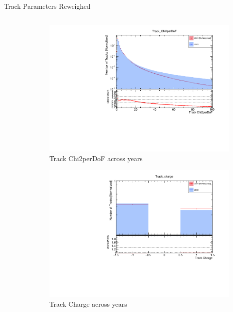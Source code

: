 \begin{frame}{Track Parameters Reweighed}
\begin{columns}
\begin{column}{0.5\linewidth}
\begin{figure}
            \end{figure}
        \end{column}
        \begin{column}{0.5\linewidth}
            \vspace{-0.45cm}
            \begin{figure}
                \includegraphics[width=\linewidth]{./ReweighedPlots/Track_Chi2perDoF_Reweighted.pdf}
                \caption{Track Chi2perDoF across years}
            \end{figure}
            \vspace{-0.9cm}
            \begin{figure}
                \includegraphics[width=\linewidth]{./ReweighedPlots/Track_charge_Reweighted.pdf}
                \caption{Track Charge across years}
            \end{figure}
        \end{column}
    \end{columns}
\end{frame}

